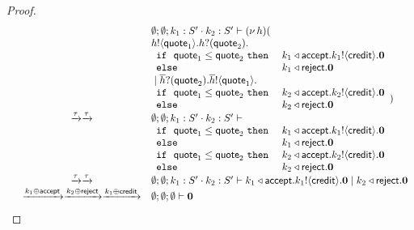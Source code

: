\begin{proof}
\[\begin{array}{rcl}
		&& \es; \es; k_1: S' \cat k_2: S' \proves \newsp{h}{\\
		&& \bout{h}{\Quote_1} \binp{h}{\Quote_2}\\
		&&
		\begin{array}{ll}
			\If\ \Quote_1 \leq \Quote_2\ \Then & \bsel{k_1}{\accept} \bout{k_1}{\creditc} \inact\\
			\Else & \bsel{k_1}{\reject} \inact
		\end{array}\\
		&& \Par \binp{\dual{h}}{\Quote_2} \bout{\dual{h}}{\Quote_1}\\
		&&
		\begin{array}{ll}
			\If\ \Quote_1 \leq \Quote_2\ \Then & \bsel{k_2}{\accept} \bout{k_2}{\creditc} \inact\\
			\Else & \bsel{k_2}{\reject} \inact
		\end{array}
		}
\\
		&\by{\tau} \by{\tau}&
		\es; \es; k_1: S' \cat k_2: S' \proves\\
		&&
		\begin{array}{ll}
			\If\ \Quote_1 \leq \Quote_2\ \Then & \bsel{k_1}{\accept} \bout{k_1}{\creditc} \inact\\
			\Else & \bsel{k_1}{\reject} \inact
		\end{array}\\
		&&
		\begin{array}{ll}
			\If\ \Quote_1 \leq \Quote_2\ \Then & \bsel{k_2}{\accept} \bout{k_2}{\creditc} \inact\\
			\Else & \bsel{k_2}{\reject} \inact
		\end{array}
\\
		&\by{\tau} \by{\tau}&
		\es; \es; k_1: S' \cat k_2: S' \proves
		\bsel{k_1}{\accept} \bout{k_1}{\creditc} \inact 
		\Par \bsel{k_2}{\reject} \inact
		\\

		&\by{\bactsel{k_1}{\accept}} \by{\bactsel{k_2}{\reject}} \by{\bactsel{k_1}{\creditc}}&
		\es; \es; \es \proves \inact
	\end{array}
\]

\end{proof}
